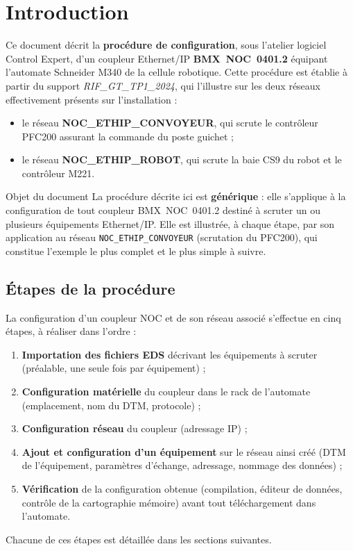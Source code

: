 \section{Introduction}

Ce document décrit la \textbf{procédure de configuration}, sous l'atelier
logiciel Control Expert, d'un coupleur Ethernet/IP \textbf{BMX~NOC~0401.2}
équipant l'automate Schneider M340 de la cellule robotique. Cette
procédure est établie à partir du support \emph{RIF\_GT\_TP1\_2024}, qui
l'illustre sur les deux réseaux effectivement présents sur l'installation :

\begin{itemize}
    \item le réseau \textbf{NOC\_ETHIP\_CONVOYEUR}, qui scrute le
    contrôleur PFC200 assurant la commande du poste guichet ;
    \item le réseau \textbf{NOC\_ETHIP\_ROBOT}, qui scrute la baie CS9 du
    robot et le contrôleur M221.
\end{itemize}

\begin{UPSTIinfor}{Objet du document}
La procédure décrite ici est \textbf{générique} : elle s'applique à la
configuration de tout coupleur BMX~NOC~0401.2 destiné à scruter un ou
plusieurs équipements Ethernet/IP. Elle est illustrée, à chaque étape, par
son application au réseau \texttt{NOC\_ETHIP\_CONVOYEUR} (scrutation du
PFC200), qui constitue l'exemple le plus complet et le plus simple à
suivre.
\end{UPSTIinfor}

\subsection{Étapes de la procédure}

La configuration d'un coupleur NOC et de son réseau associé s'effectue en
cinq étapes, à réaliser dans l'ordre :

\begin{enumerate}
    \item \textbf{Importation des fichiers EDS} décrivant les équipements
    à scruter (préalable, une seule fois par équipement) ;
    \item \textbf{Configuration matérielle} du coupleur dans le rack de
    l'automate (emplacement, nom du DTM, protocole) ;
    \item \textbf{Configuration réseau} du coupleur (adressage IP) ;
    \item \textbf{Ajout et configuration d'un équipement} sur le réseau
    ainsi créé (DTM de l'équipement, paramètres d'échange, adressage,
    nommage des données) ;
    \item \textbf{Vérification} de la configuration obtenue (compilation,
    éditeur de données, contrôle de la cartographie mémoire) avant tout
    téléchargement dans l'automate.
\end{enumerate}

Chacune de ces étapes est détaillée dans les sections suivantes.
